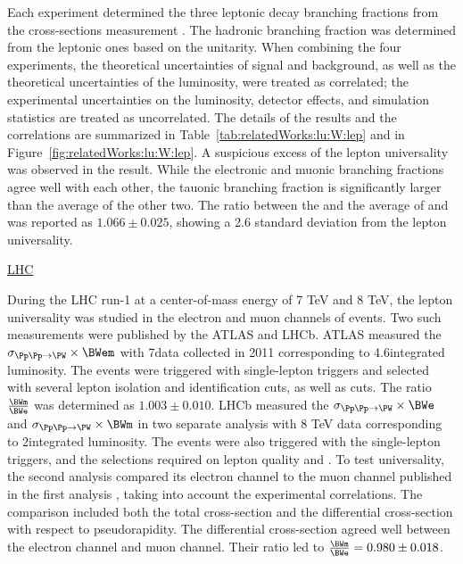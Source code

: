 Each experiment determined the three \PW leptonic decay branching fractions from the \WW cross-sections measurement \cite{Schael:2013ita}. The hadronic branching fraction was determined from the leptonic ones based on the unitarity. When combining the four experiments, the theoretical uncertainties of signal and background, as well as the theoretical uncertainties of the luminosity, were treated as correlated; the experimental uncertainties on the luminosity, detector effects, and simulation statistics are treated as uncorrelated. The details of the \BWl results and the correlations are summarized in Table~\ref{tab:relatedWorks:lu:W:lep} and in Figure~\ref{fig:relatedWorks:lu:W:lep}. A suspicious excess of the lepton universality was observed in the result. While the electronic and muonic branching fractions agree well with each other, the tauonic branching fraction is significantly larger than the average of the other two. The ratio between the \BWt and the average of \BWe and \BWm was reported as \cite{Schael:2013ita} $1.066 \pm 0.025$, showing a 2.6 standard deviation from the lepton universality.





\FloatBarrier
\underline{LHC}

During the LHC run-1 at a center-of-mass energy of 7 TeV and 8 TeV, the lepton universality was studied in the electron and muon channels of \wjets events. Two such measurements were published by the ATLAS and LHCb. ATLAS measured the $\sigma_{\Pp\Pp \to \PW} \times \BWem$ \cite{Aaboud:2016btc} with 7\TeV data collected in 2011 corresponding to 4.6\fbinv integrated luminosity. The events were triggered with single-lepton triggers and selected with several lepton isolation and identification cuts, as well as \MET cuts. The ratio $\frac{ \BWm }{ \BWe}$ was determined as $1.003\pm 0.010$. LHCb measured the $\sigma_{\Pp\Pp \to \PW} \times \BWe$ \cite{Aaij:2016qqz} and $\sigma_{\Pp\Pp \to \PW} \times \BWm$ \cite{Aaij:2015zlq} in two separate analysis with 8 TeV data corresponding to 2\fbinv integrated luminosity. The events were also triggered with the single-lepton triggers, and the selections required on lepton quality and \MET. To test universality, the second analysis \cite{Aaij:2016qqz} compared its electron channel to the muon channel published in the first analysis \cite{Aaij:2015zlq}, taking into account the experimental correlations. The comparison included both the total cross-section and the differential cross-section with respect to pseudorapidity. The differential cross-section agreed well between the electron channel and muon channel. Their ratio led to $\frac{ \BWm }{ \BWe}  = 0.980 \pm 0.018 $.


